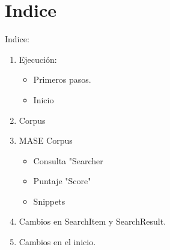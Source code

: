\section*{Indice}
\begin{frame}
Indice:    
    \begin{enumerate}
        \item Ejecución:
        \begin{itemize}
            \item Primeros pasos.
            \item Inicio
        \end{itemize}
        \item Corpus
        \item MASE Corpus
            \begin{itemize}
                \item Consulta "Searcher
                \item Puntaje "Score"
                \item Snippets
            \end{itemize}
        \item Cambios en SearchItem y SearchResult.
        \item Cambios en el inicio.
    \end{enumerate}
\end{frame}